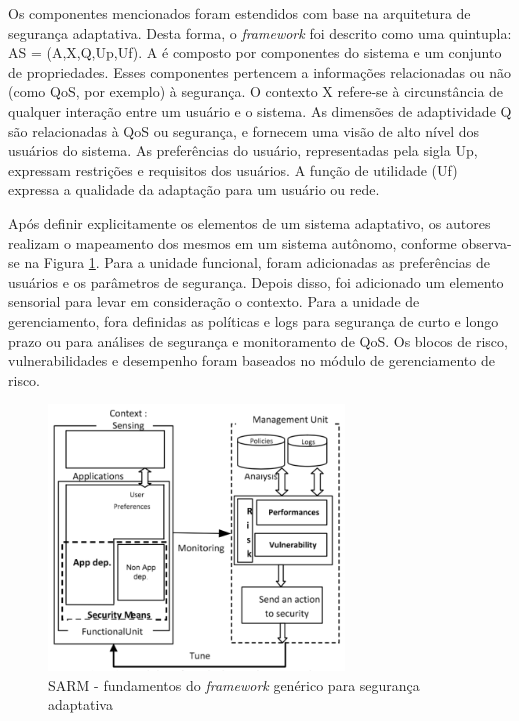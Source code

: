 \documentclass[tid,table]{texufpel} %
\begin{document}
Os componentes mencionados foram estendidos com base na arquitetura de segurança adaptativa. Desta forma, o \textit{framework} foi descrito como uma quintupla: AS = (A,X,Q,Up,Uf). A é composto por componentes do sistema e um conjunto de propriedades. Esses componentes pertencem a informações relacionadas ou não (como QoS, por exemplo) à segurança.  O contexto X refere-se à circunstância de qualquer interação entre um usuário e o sistema. As dimensões de adaptividade Q são relacionadas à QoS ou segurança, e fornecem uma visão de alto nível dos usuários do sistema. As preferências do usuário, representadas pela sigla Up, expressam restrições e requisitos dos usuários. A função de utilidade (Uf) expressa a qualidade da adaptação para um usuário ou rede.

Após definir explicitamente os elementos de um sistema adaptativo, os autores realizam o mapeamento dos mesmos em um sistema autônomo, conforme observa-se na Figura \ref{sarm-framework}. Para a unidade funcional, foram adicionadas as preferências de usuários e os parâmetros de segurança. Depois disso, foi adicionado um elemento sensorial para levar em consideração o contexto. Para a unidade de gerenciamento, fora definidas as políticas e logs para segurança de curto e longo prazo  ou para análises de segurança e monitoramento de QoS.  Os blocos de risco, vulnerabilidades e desempenho foram baseados no módulo de gerenciamento de risco.

\begin{figure}[ht]
\centering
\includegraphics[width=0.7\textwidth]{imagens/sarm-framework.png}
\caption{SARM - fundamentos do \textit{framework} genérico para segurança adaptativa}
\label{sarm-framework}
\end{figure}
\end{document}
